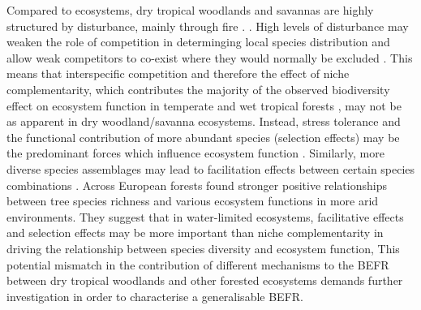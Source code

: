 \documentclass[11pt,a4paper]{article}
\begin{document}
Compared to  ecosystems, dry tropical woodlands and savannas are highly structured by disturbance, mainly through fire  \citep{Sankaran2008, Levick2009}. . High levels of disturbance may weaken the role of competition in determinging local species distribution and allow weak competitors to co-exist where they would normally be excluded \citep{Grime1979, Grace1990}. This means that interspecific competition and therefore the effect of niche complementarity, which contributes the majority of the observed biodiversity effect on ecosystem function in temperate and wet tropical forests \citep{Wright2017, Poorter2015, Sande2017a}, may not be as apparent in dry woodland/savanna ecosystems. Instead, stress tolerance and the functional contribution of more abundant species (selection effects) may be the predominant forces which influence ecosystem function \citep{Lasky2014, Tobner2016}. Similarly, more diverse species assemblages may lead to facilitation effects between certain species combinations . Across European forests \citet{Ratcliffe2017} found stronger positive relationships between tree species richness and various ecosystem functions in more arid environments. They suggest that in water-limited ecosystems, facilitative effects and selection effects may be more important than niche complementarity in driving the relationship between species diversity and ecosystem function,  This potential mismatch in the contribution of different mechanisms to the BEFR between dry tropical woodlands and other forested ecosystems demands further investigation in order to characterise a generalisable BEFR.
\end{document}
